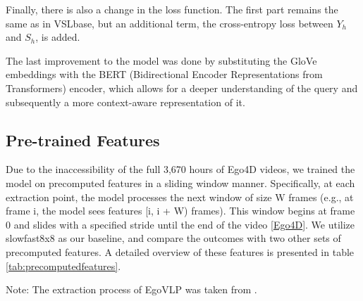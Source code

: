 \documentclass[10pt,twocolumn,letterpaper]{article}
\begin{document}
Finally, there is also a change in the loss function. The first part remains the same as in VSLbase, but an additional term, the cross-entropy loss between $Y_{h}$ and $S_{h}$, is added.

The last improvement to the model was done by substituting the GloVe embeddings with the BERT (Bidirectional Encoder Representations from Transformers) encoder, which allows for a deeper understanding of the query and subsequently a more context-aware representation of it.

\subsection{Pre-trained Features}
Due to the inaccessibility of the full 3,670 hours of Ego4D videos, we trained the model on precomputed features in a sliding window manner. Specifically, at each extraction point, the model processes the next window of size W frames (e.g., at frame i, the model sees features [i, i + W) frames). This window begins at frame 0 and slides with a specified stride until the end of the video [\href{https://ego4d-data.org/docs/data/features/}{Ego4D}]. We utilize slowfast8x8 as our baseline, and compare the outcomes with two other sets of precomputed features. A detailed overview of these features is presented in table \ref{tab:precomputedfeatures}.

\begin{table}[h]
\centering
\caption{Pre-computed Features for Ego4D}
\label{tab:precomputedfeatures}
\setlength{\tabcolsep}{4pt}
\renewcommand{\arraystretch}{1.2}

\begin{minipage}{\linewidth}
\vspace{0.1cm}  %
{\footnotesize * Note: The extraction process of EgoVLP was taken from \cite{egoVLP}.}  
\end{minipage}
\end{table}
\end{document}
